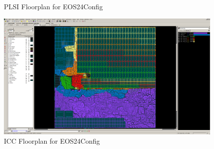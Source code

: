 \documentclass{article}
\begin{document}
\begin{figure}
\begin{verbatim}
\end{verbatim}
  \caption{PLSI Floorplan for EOS24Config}
  \label{res:rocket-fppy}
\end{figure}

\begin{figure}
  \begin{center}
    \includegraphics[width=0.95\linewidth]{figures/icc-hwacha.png}
  \end{center}
  \caption{ICC Floorplan for EOS24Config}
  \label{res:hwacha-icc}
\end{figure}
\end{document}
